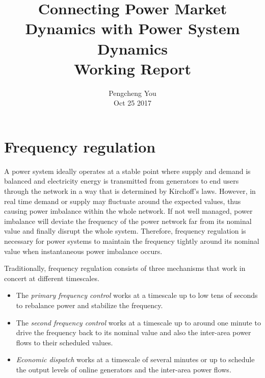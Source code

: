 \documentclass[journal,12pt,onecolumn,draftclsnofoot]{IEEEtran}
\begin{document}
\title{Connecting Power Market Dynamics with Power System Dynamics \\ \Large{Working Report}}


\author{Pengcheng You \\  Oct 25 2017%
}


\maketitle


%

%
%


\IEEEpeerreviewmaketitle



\section{Frequency regulation}

A power system ideally operates at a stable point where supply and demand is balanced and electricity energy is transmitted from generators to end users through the network in a way that is determined by Kirchoff's laws. However, in real time demand or supply may fluctuate around the expected values, thus causing power imbalance within the whole network. If not well managed, power imbalance will deviate the frequency of the power network far from its nominal value and finally disrupt the whole system. Therefore, frequency regulation is necessary for power systems to maintain the frequency tightly around its nominal value when instantaneous power imbalance occurs.

Traditionally, frequency regulation consists of three mechanisms that work in concert at different timescales.
\begin{itemize}
\item The \emph{primary frequency control} works at a timescale up to low tens of seconds to rebalance power and stabilize the frequency.
\item The \emph{second frequency control} works at a timescale up to around one minute to drive the frequency back to its nominal value and also the inter-area power flows to their scheduled values.
\item \emph{Economic dispatch} works at a timescale of several minutes or up to schedule the output levels of online generators and the inter-area power flows. 
\end{itemize}
\end{document}
